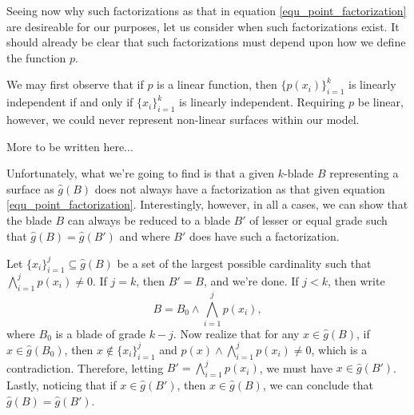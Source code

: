 \documentclass{birkjour}
\theoremstyle{definition}
\theoremstyle{remark}
\numberwithin{equation}{section}
\newcommand{\gh}{\hat{g}}
\begin{document}
Seeing now why such factorizations as that in equation \eqref{equ_point_factorization} are desireable for
our purposes, let us consider when such factorizations exist.  It should already be clear that
such factorizations must depend upon how we define the function $p$.

We may first observe that if $p$ is a linear function, then $\{p(x_i)\}_{i=1}^k$ is linearly
independent if and only if $\{x_i\}_{i=1}^k$ is linearly independent.
Requiring $p$ be linear, however, we could never represent non-linear surfaces within
our model.

More to be written here...

Unfortunately, what we're going to find is that a given $k$-blade $B$ representing
a surface as $\gh(B)$ does not always have a factorization as that
given equation \eqref{equ_point_factorization}.  Interestingly, however,
in all a cases, we can show that the blade $B$ can always be reduced to a blade
$B'$ of lesser or equal grade such that $\gh(B)=\gh(B')$ and where $B'$ does have
such a factorization.

Let $\{x_i\}_{i=1}^j\subseteq\gh(B)$ be a set of the largest possible cardinality such that
$\bigwedge_{i=1}^j p(x_i)\neq 0$.  If $j=k$, then $B'=B$, and we're done.  If $j<k$,
then write
\begin{equation*}
B = B_0\wedge\bigwedge_{i=1}^j p(x_i),
\end{equation*}
where $B_0$ is a blade of grade $k-j$.  Now realize that for any $x\in\gh(B)$, if
$x\in\gh(B_0)$, then $x\not\in\{x_i\}_{i=1}^j$ and $p(x)\wedge\bigwedge_{i=1}^j p(x_i)\neq 0$,
which is a contradiction.  Therefore, letting $B'=\bigwedge_{i=1}^j p(x_i)$,
we must have $x\in\gh(B')$.  Lastly, noticing that if $x\in\gh(B')$, then $x\in\gh(B)$,
we can conclude that $\gh(B)=\gh(B')$.


\end{document}
